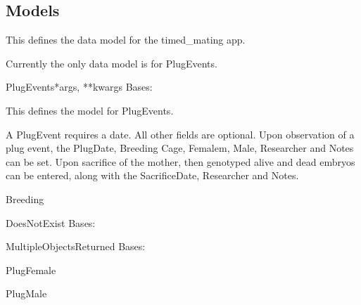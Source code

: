 \documentclass[letterpaper,10pt,english]{sphinxmanual}
\begin{document}
\subsection{Models}
\hypertarget{module-timed\_mating.models}{}
\modulesynopsis{}
This defines the data model for the timed\_mating app.

Currently the only data model is for PlugEvents.

\hypertarget{timed\_mating.models.PlugEvents}{}\begin{classdesc}{PlugEvents}{*args, **kwargs}
Bases: 

This defines the model for PlugEvents.

A PlugEvent requires a date.  All other fields are optional.
Upon observation of a plug event, the PlugDate, Breeding Cage, Femalem, Male, Researcher and Notes can be set.
Upon sacrifice of the mother, then genotyped alive and dead embryos can be entered, along with the SacrificeDate, Researcher and Notes.

\hypertarget{timed\_mating.models.PlugEvents.Breeding}{}\begin{memberdesc}{Breeding}\end{memberdesc}

\hypertarget{timed\_mating.models.PlugEvents.DoesNotExist}{}\begin{excdesc}{DoesNotExist}
Bases: 
\end{excdesc}

\hypertarget{timed\_mating.models.PlugEvents.MultipleObjectsReturned}{}\begin{excdesc}{MultipleObjectsReturned}
Bases: 
\end{excdesc}

\hypertarget{timed\_mating.models.PlugEvents.PlugFemale}{}\begin{memberdesc}[PlugEvents]{PlugFemale}\end{memberdesc}

\hypertarget{timed\_mating.models.PlugEvents.PlugMale}{}\begin{memberdesc}[PlugEvents]{PlugMale}\end{memberdesc}


\end{classdesc}
\end{document}
